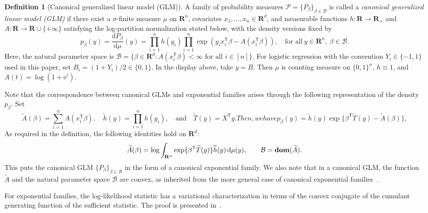 \documentclass[11pt, letterpaper, hidelinks]{article}
\newcommand{\R}{\mathbf R}
\newcommand{\cB}{\mathcal{B}}
\newcommand{\cP}{\mathcal{P}}
\newcommand{\e}{\mathrm{e}}
\newcommand{\ud}[0]{\mathrm{d}}
\newcommand{\1}{\mathbf 1}
\let\tilde\widetilde
\DeclareMathOperator{\dom}{\bf dom}
\newcommand{\T}{\mathsf{T}}
\theoremstyle{plain}
\theoremstyle{definition}
\newtheorem{definition}{Definition}[section]
\newcommand{\defn}{=}
\begin{document}
\begin{definition}[Canonical generalized linear model (GLM)]
A family of probability measures $\cP = \{P_\beta\}_{\beta \in \cB}$ is called a \emph{canonical generalized linear model (GLM)} if there exist a $\sigma$-finite measure $\mu$ on $\R^n$, covariates $x_1, \dots, x_n \in \R^d$, and measurable functions $h\colon\R\to\R_+$ and $A\colon\R\to\R\cup\{+\infty\}$ satisfying the log-partition normalization stated below, with the density versions fixed by
\[
p_\beta(y) = \frac{\ud P_\beta}{\ud \mu}(y) = \prod_{i=1}^n h(y_i) \prod_{i=1}^n \exp(y_i x_i^\T \beta - A(x_i^\T \beta)), \quad \mbox{for all}~y \in \R^n,~\beta\in\cB.
\]
Here, the natural parameter space is
$\cB=\{\beta\in\R^d:A(x_i^\T\beta)<\infty\text{ for all }i\in[n]\}$.
For logistic regression with the convention $Y_i\in\{-1,1\}$ used in this
paper, set $B_i=(1+Y_i)/2\in\{0,1\}$. In the display above, take $y=B$. Then $\mu$ is counting measure on
$\{0,1\}^n$, $h\equiv1$, and $A(t)=\log(1+\e^t)$.
\end{definition}

Note that the correspondence between canonical GLMs and exponential families arises through the following representation of the density $p_\beta$. Set
\begin{subequations}
\begin{equation}
\label{eqn:exp-family-parameters-GLM}
\tilde A(\beta)\defn \sum_{i=1}^n A(x_i^\T \beta), \quad 
\tilde h(y) = \prod_{i=1}^n h(y_i), \quad \mbox{and} \quad \tilde T(y) = X^\T y. 
\end{equation}
Then, we have 
\begin{equation}
\label{eqn:exp-family-representation}
p_\beta(y)
= \tilde h(y) \exp\Big\{\beta^\T \tilde T(y) - \tilde A(\beta)\Big\},
\end{equation}
\end{subequations}
As required in the definition, the following identities hold on $\R^d$:
\[
\tilde A(\beta)=\log\int_{\R^n}
\exp\{\beta^\T\tilde T(y)\}\tilde h(y)\,\ud\mu(y),
\qquad
\cB=\dom(\tilde A).
\]
This puts the canonical GLM $\{P_\beta\}_{\beta \in \cB}$ in the form of 
a canonical exponential family. We also note that in a canonical GLM, the function $\tilde A$ and the natural parameter space $\cB$ are convex, as inherited from the more general case of canonical exponential families~\cite[Theorem~1.6.3]{bickel2007mathematical}.

For exponential families, the log-likelihood statistic has a variational characterization in terms of the convex conjugate of the cumulant generating function of the sufficient statistic.
The proof is presented in~.
\end{document}
